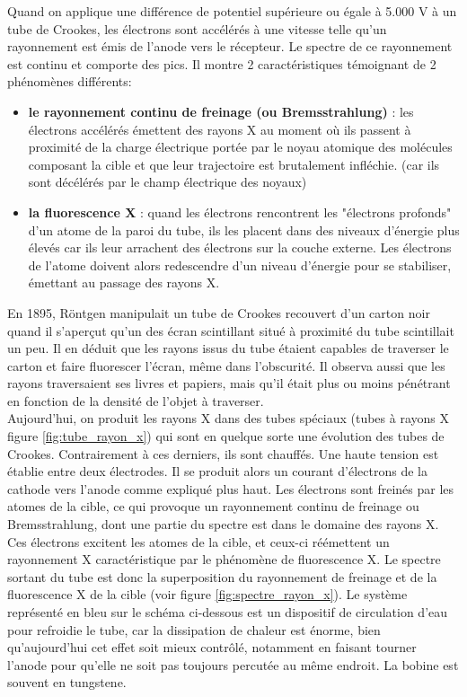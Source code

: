 Quand on applique une différence de potentiel supérieure ou égale à 5.000 V à un tube de Crookes, les électrons sont accélérés à une vitesse telle qu'un rayonnement est émis de l'anode vers le récepteur. Le spectre de ce rayonnement est continu et comporte des pics. Il montre 2 caractéristiques témoignant de 2 phénomènes différents:

\begin{itemize}
    \item \textbf{le rayonnement continu de freinage (ou Bremsstrahlung)} : les électrons accélérés émettent des rayons X au moment où ils passent à proximité de la charge électrique portée par le noyau atomique des molécules composant la cible et que leur trajectoire est brutalement infléchie. (car ils sont décélérés par le champ électrique des noyaux)
    \item \textbf{la fluorescence X} : quand les électrons rencontrent les "électrons profonds" d'un atome de la paroi du tube, ils les placent dans des niveaux d'énergie plus élevés car ils leur arrachent des électrons sur la couche externe. Les électrons de l'atome doivent alors redescendre d'un niveau d'énergie pour se stabiliser, émettant au passage des rayons X.
\end{itemize}

En 1895, Röntgen manipulait un tube de Crookes recouvert d'un carton noir quand il s'aperçut qu'un des écran scintillant situé à proximité du tube scintillait un peu. Il en déduit que les rayons issus du tube étaient capables de traverser le carton et faire fluorescer l'écran, même dans l'obscurité. Il observa aussi que les rayons traversaient ses livres et papiers, mais qu'il était plus ou moins pénétrant en fonction de la densité de l'objet à traverser. \\

Aujourd'hui, on produit les rayons X dans des tubes spéciaux (tubes à rayons X figure \ref{fig:tube_rayon_x}) qui sont en quelque sorte une évolution des tubes de Crookes. Contrairement à ces derniers, ils sont chauffés. Une haute tension est établie entre deux électrodes. Il se produit alors un courant d'électrons de la cathode vers l'anode comme expliqué plus haut. Les électrons sont freinés par les atomes de la cible, ce qui provoque un rayonnement continu de freinage ou Bremsstrahlung, dont une partie du spectre est dans le domaine des rayons X. Ces électrons excitent les atomes de la cible, et ceux-ci réémettent un rayonnement X caractéristique par le phénomène de fluorescence X. Le spectre sortant du tube est donc la superposition du rayonnement de freinage et de la fluorescence X de la cible (voir figure \ref{fig:spectre_rayon_x}). Le système représenté en bleu sur le schéma ci-dessous est un dispositif de circulation d'eau pour refroidie le tube, car la dissipation de chaleur est énorme, bien qu'aujourd'hui cet effet soit mieux contrôlé, notamment en faisant tourner l'anode pour qu'elle ne soit pas toujours percutée au même endroit. La bobine est souvent en tungstene.

